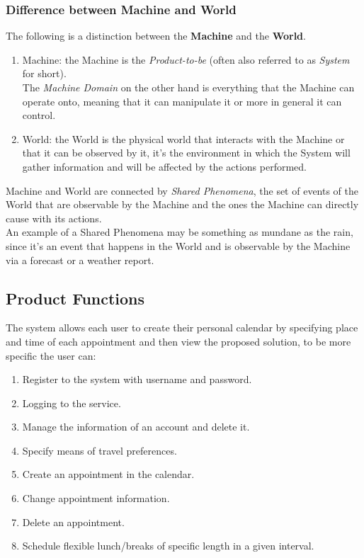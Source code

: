 \begin{samepage}
\subsubsection*{Difference between Machine and World}
The following is a distinction between the \textbf{Machine} and the \textbf{World}.
\begin{enumerate}
\item Machine: the Machine is the \textit{Product-to-be} (often also referred to as \textit{System} for short).
\\The \textit{Machine Domain} on the other hand is everything that the Machine can operate onto, meaning that it can manipulate it or more in general it can control.
\item World: the World is the physical world that interacts with the Machine or that it can be observed by it, it's the environment in which the System will gather information and will be affected by the actions performed.
\end{enumerate}
Machine and World are connected by \textit{Shared Phenomena}, the set of events of the World that are observable by the Machine and the ones the Machine can directly cause with its actions.
\\An example of a Shared Phenomena may be something as mundane as the rain, since it's an event that happens in the World and is observable by the Machine via a forecast or a weather report.
\subsection{Product Functions}
The system allows each user to create their personal calendar by specifying place and time of each appointment and then view the proposed solution, to be more specific the user can:
\begin{enumerate}
\item Register to the system with username and password.
\item Logging to the service.
\item Manage the information of an account and delete it.
\item Specify means of travel preferences.
\item Create an appointment in the calendar.
\item Change appointment information.
\item Delete an appointment.
\item Schedule flexible lunch/breaks of specific length in a given interval.
\end{enumerate}
\par

\end{samepage}
